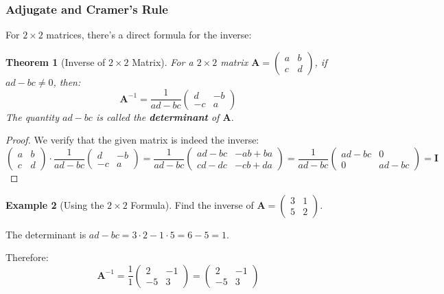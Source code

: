 \documentclass[12pt]{article}
\numberwithin{equation}{section}
\newcommand{\mat}[1]{\mathbf{#1}}        %
\theoremstyle{plain}
\newtheorem{theorem}{Theorem}[section]
\theoremstyle{definition}
\newtheorem{example}[theorem]{Example}
\theoremstyle{remark}
\begin{document}
\subsubsection{Adjugate and Cramer's Rule}

For $2 \times 2$ matrices, there's a direct formula for the inverse:

\begin{theorem}[Inverse of $2 \times 2$ Matrix]
For a $2 \times 2$ matrix $\mat{A} = \begin{pmatrix} a & b \\ c & d \end{pmatrix}$, if $ad - bc \neq 0$, then:
$$\mat{A}^{-1} = \frac{1}{ad - bc}\begin{pmatrix} d & -b \\ -c & a \end{pmatrix}$$
The quantity $ad - bc$ is called the \textbf{determinant} of $\mat{A}$.
\end{theorem}

\begin{proof}
We verify that the given matrix is indeed the inverse:
$$\begin{pmatrix} a & b \\ c & d \end{pmatrix} \cdot \frac{1}{ad-bc}\begin{pmatrix} d & -b \\ -c & a \end{pmatrix} = \frac{1}{ad-bc}\begin{pmatrix} ad-bc & -ab+ba \\ cd-dc & -cb+da \end{pmatrix} = \frac{1}{ad-bc}\begin{pmatrix} ad-bc & 0 \\ 0 & ad-bc \end{pmatrix} = \mat{I}$$
\end{proof}

\begin{example}[Using the $2 \times 2$ Formula]
Find the inverse of $\mat{A} = \begin{pmatrix} 3 & 1 \\ 5 & 2 \end{pmatrix}$.

The determinant is $ad - bc = 3 \cdot 2 - 1 \cdot 5 = 6 - 5 = 1$.

Therefore:
$$\mat{A}^{-1} = \frac{1}{1}\begin{pmatrix} 2 & -1 \\ -5 & 3 \end{pmatrix} = \begin{pmatrix} 2 & -1 \\ -5 & 3 \end{pmatrix}$$
\end{example}
\end{document}
